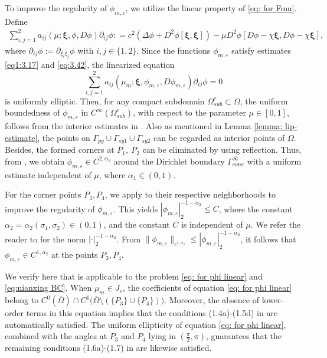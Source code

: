 \documentclass[reqno,12pt]{amsart}
\numberwithin{equation}{section}
\begin{document}
To improve the regularity of $\phi_{m,\varepsilon}$, we utilize the linear property of \eqref{eq: for Fmu}. Define 
\begin{multline}\label{eq: for phi form}
  \sum^{2}_{i,j=1} a_{ij}(\mu; \bm{\xi}, \phi, D\phi) \partial_{ij}\phi:
=c^{2}(\Delta \phi+D^{2} \phi[\bm{\xi},\bm{\xi}])-\mu D^{2}\phi[D\phi-\chi\bm{\xi},D\phi-\chi\bm{\xi}],
\end{multline}
where $\partial_{ij}\phi:=\partial_{\xi_i\xi_j}\phi$ with $i,j\in\{1,2\}$. Since the functions $\phi_{m,\varepsilon}$ satisfy estimates \eqref{eq1:3.17} and \eqref{eq:3.42}, the linearized equation
\begin{equation}\label{eq: for phi linear}
\sum^{2}_{i,j=1} a_{ij}(\mu_{m}; \bm{\xi}, \phi_{m,\varepsilon}, D\phi_{m,\varepsilon}) \partial_{ij}\phi=0
\end{equation}
is uniformly elliptic. Then, for any compact subdomain $\Omega^{c}_{sub}\subset \Omega$, the uniform boundedness of $\phi_{m,\varepsilon}$ in $C^\infty(\Omega^{c}_{sub})$, with respect to the parameter $\mu\in[0,1]$, follows from the interior estimates in \cite[Theorem 6.17]{GT01}. Also as mentioned in Lemma \ref{lemma: lip-estimate}, the points on $\Gamma_{py}\cup\Gamma_{sy1}\cup\Gamma_{sy2}$ can be regarded as interior points of $\Omega$. Besides, the formed corners at $P_1,~P_2$ can be eliminated by using reflection. Thus, from \cite[Corollary 6.7 and Lemma 6.18]{GT01}, we obtain $\phi_{m,\varepsilon}\in C^{2,\alpha_1}$ around the Dirichlet boundary $\overline{\Gamma_{cone}^{\infty}}$ with a uniform estimate independent of $\mu$, where $\alpha_1\in (0,1)$. 

For the corner points $P_3, P_4$, we apply \cite[Lemma 1.3]{Lieb88} to their respective neighborhoods to improve the regularity of $\phi_{m,\varepsilon}$. This yields $|\phi_{m,\varepsilon}|^{-1-\alpha_2}_2\leq C$, where the constant $\alpha_2=\alpha_2(\sigma_1,\sigma_2)\in(0,1)$, and the constant $C$ is independent of $\mu$. We refer the reader to \cite{GH80,Lieb88} for the norm $|\cdot|^{-1-\alpha_2}_{2}$. From  $\|\phi_{m,\varepsilon}\|_{c^{1,\alpha_2}}\leq|\phi_{m,\varepsilon}|^{-1-\alpha_2}_2$, it follows that $\phi_{m,\varepsilon}\in C^{1,\alpha_2}$ at the points $P_3,P_4$.

We verify here that \cite[Lemma 1.3]{Lieb88} is applicable to the problem \eqref{eq: for phi linear} and \eqref{eq:nianxing BC}.  When $\mu_{m}\in J_{\varepsilon}$, the coefficients of equation \eqref{eq: for phi linear} belong to $C^{0}(\overline{\Omega})\cap C^1\big(\overline{\Omega}\setminus(\{P_3\}\cup\{P_4\})\big)$. Moreover, the absence of lower-order terms in this equation implies that the conditions (1.4a)-(1.5d) in \cite{Lieb88} are automatically satisfied. The uniform ellipticity of equation \eqref{eq: for phi linear}, combined with the angles at $P_3$ and $P_4$ lying in $(\frac{\pi}{2},\pi)$, guarantees that the remaining conditions (1.6a)-(1.7) in \cite{Lieb88} are likewise satisfied.
\end{document}
